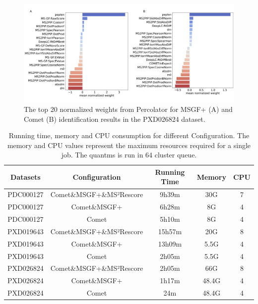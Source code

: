 \documentclass[12pt]{article}
\begin{document}
\begin{figure}[ht!]
	\centering
	\includegraphics[width=1\textwidth]{figures//phos_weights.png}
	\caption{The top 20 normalized weights from Percolator for MSGF+ (A) and Comet (B) identification results in the PXD026824 dataset.}
	\label{fig:phospho_features}
\end{figure}


\renewcommand\thetable{S\arabic{table}}
\setcounter{table}{0}

\begin{table}[h!]
	\centering
	\caption{Running time, memory and CPU consumption for different Configuration. The memory and CPU values represent the maximum resources required for a single job. The quantms is run in 64 cluster queue.}
	\begin{tabular}{|c|c|c|c|c|}
		\hline
		Datasets & Configuration & Running Time & Memory & CPU \\
		\hline
		PDC000127 & Comet\&MSGF+\&MS²Rescore & 9h39m & 30G & 7 \\
		PDC000127 & Comet\&MSGF+ & 6h28m & 8G & 4 \\
		PDC000127 & Comet & 5h10m & 8G & 4 \\
		PXD019643 & Comet\&MSGF+\&MS²Rescore & 15h57m & 20G & 8 \\
		PXD019643 & Comet\&MSGF+ & 13h09m & 5.5G & 4 \\
		PXD019643 & Comet & 2h05m & 5.5G & 4 \\
		PXD026824 & Comet\&MSGF+\&MS²Rescore & 2h05m & 66G & 8 \\
		PXD026824 & Comet\&MSGF+ & 1h17m & 48.4G & 4 \\
		PXD026824 & Comet & 24m & 48.4G & 4 \\
		\hline
	\end{tabular}
	\label{tab:resources_stats}
\end{table}
\end{document}
